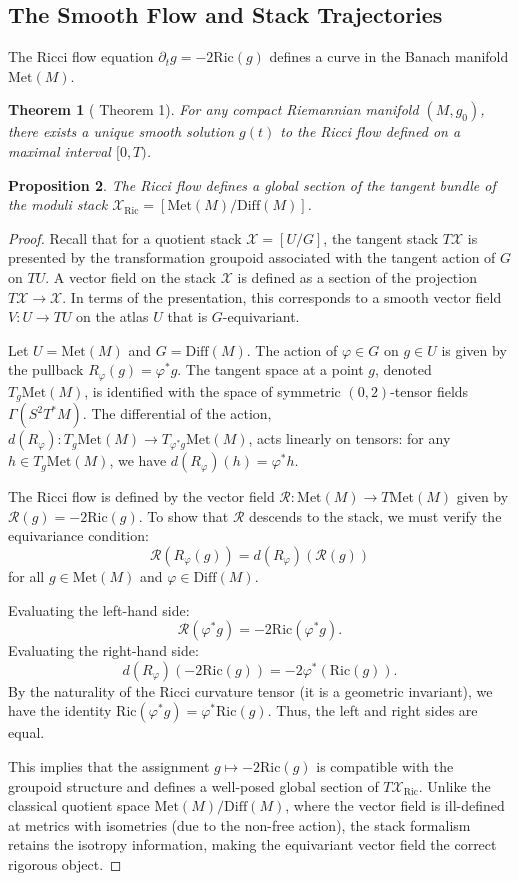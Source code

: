 \documentclass[11pt]{article}
\newtheorem{theorem}{Theorem}[section]
\newtheorem{proposition}[theorem]{Proposition}
\newcommand{\Met}{\mathrm{Met}}
\newcommand{\Diff}{\mathrm{Diff}}
\begin{document}
\subsection*{The Smooth Flow and Stack Trajectories}
The Ricci flow equation $\partial_t g = -2\mathrm{Ric}(g)$ defines a curve in the Banach manifold $\Met(M)$. 
\begin{theorem}[\cite{DeT83} Theorem 1]
For any compact Riemannian manifold $(M, g_0)$, there exists a unique smooth solution $g(t)$ to the Ricci flow defined on a maximal interval $[0, T)$.
\end{theorem}
\begin{proposition}
The Ricci flow defines a global section of the tangent bundle of the moduli stack $\mathcal{X}_{\mathrm{Ric}} = [\Met(M) / \Diff(M)]$.
\end{proposition}

\begin{proof}
Recall that for a quotient stack $\mathcal{X} = [U / G]$, the tangent stack $T\mathcal{X}$ is presented by the transformation groupoid associated with the tangent action of $G$ on $T U$. A vector field on the stack $\mathcal{X}$ is defined as a section of the projection $T\mathcal{X} \to \mathcal{X}$. In terms of the presentation, this corresponds to a smooth vector field $V: U \to TU$ on the atlas $U$ that is $G$-equivariant.

Let $U = \Met(M)$ and $G = \Diff(M)$. The action of $\varphi \in G$ on $g \in U$ is given by the pullback $R_\varphi(g) = \varphi^* g$. The tangent space at a point $g$, denoted $T_g \Met(M)$, is identified with the space of symmetric $(0,2)$-tensor fields $\Gamma(S^2 T^*M)$. The differential of the action, $d(R_\varphi): T_g \Met(M) \to T_{\varphi^* g} \Met(M)$, acts linearly on tensors: for any $h \in T_g \Met(M)$, we have $d(R_\varphi)(h) = \varphi^* h$.

The Ricci flow is defined by the vector field $\mathcal{R}: \Met(M) \to T\Met(M)$ given by $\mathcal{R}(g) = -2\mathrm{Ric}(g)$. To show that $\mathcal{R}$ descends to the stack, we must verify the equivariance condition:
\[ \mathcal{R}(R_\varphi(g)) = d(R_\varphi)(\mathcal{R}(g)) \]
for all $g \in \Met(M)$ and $\varphi \in \Diff(M)$.

Evaluating the left-hand side:
\[ \mathcal{R}(\varphi^* g) = -2\mathrm{Ric}(\varphi^* g). \]
Evaluating the right-hand side:
\[ d(R_\varphi)(-2\mathrm{Ric}(g)) = -2\varphi^* (\mathrm{Ric}(g)). \]
By the naturality of the Ricci curvature tensor (it is a geometric invariant), we have the identity $\mathrm{Ric}(\varphi^* g) = \varphi^* \mathrm{Ric}(g)$. Thus, the left and right sides are equal. 

This implies that the assignment $g \mapsto -2\mathrm{Ric}(g)$ is compatible with the groupoid structure and defines a well-posed global section of $T\mathcal{X}_{\mathrm{Ric}}$. Unlike the classical quotient space $\Met(M)/\Diff(M)$, where the vector field is ill-defined at metrics with isometries (due to the non-free action), the stack formalism retains the isotropy information, making the equivariant vector field the correct rigorous object.
\end{proof}
\end{document}
